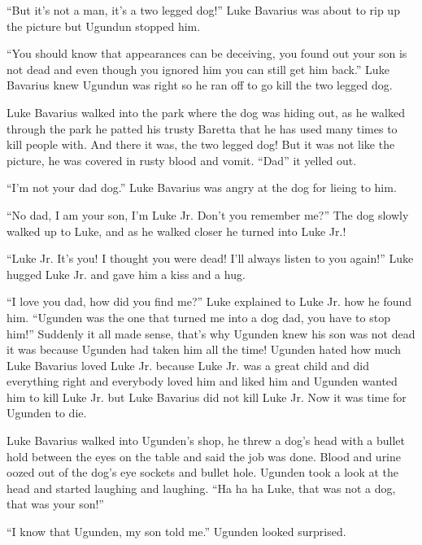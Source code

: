 ``But it's not a man, it's a two legged dog!'' Luke
Bavarius was about to rip up the picture but Ugundun stopped
him.



``You should know that appearances can be deceiving, you found
out your son is not dead and even though you ignored him you can
still get him back.'' Luke Bavarius knew Ugundun was right so
he ran off to go kill the two legged dog.



Luke Bavarius walked into the park where the dog was hiding out, as
he walked through the park he patted his trusty Baretta that he has
used many times to kill people with. And there it was, the two
legged dog! But it was not like the picture, he was covered in
rusty blood and vomit. ``Dad'' it yelled out.



``I'm not your dad dog.'' Luke Bavarius was angry at the
dog for lieing to him.



``No dad, I am your son, I'm Luke Jr. Don't you remember
me?'' The dog slowly walked up to Luke, and as he walked
closer he turned into Luke Jr.!



``Luke Jr. It's you! I thought you were dead! I'll always
listen to you again!'' Luke hugged Luke Jr. and gave him a
kiss and a hug.



``I love you dad, how did you find me?'' Luke explained
to Luke Jr. how he found him. ``Ugunden was the one that
turned me into a dog dad, you have to stop him!'' Suddenly it
all made sense, that's why Ugunden knew his son was not dead it was
because Ugunden had taken him all the time! Ugunden hated how much
Luke Bavarius loved Luke Jr. because Luke Jr. was a great child and
did everything right and everybody loved him and liked him and
Ugunden wanted him to kill Luke Jr. but Luke Bavarius did not kill
Luke Jr. Now it was time for Ugunden to die.



Luke Bavarius walked into Ugunden's shop, he threw a dog's head
with a bullet hold between the eyes on the table and said the job
was done. Blood and urine oozed out of the dog's eye sockets and
bullet hole. Ugunden took a look at the head and started laughing
and laughing. ``Ha ha ha Luke, that was not a dog, that was
your son!''



``I know that Ugunden, my son told me.'' Ugunden looked
surprised.



